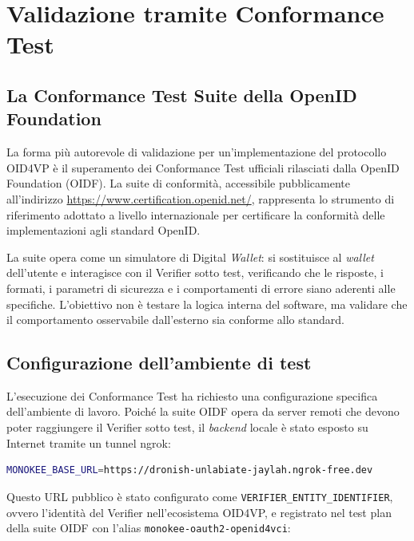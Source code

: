 \section{Validazione tramite Conformance Test}
\label{sec:validazione_conformance}

\subsection{La Conformance Test Suite della OpenID Foundation}
La forma più autorevole di validazione per un'implementazione del protocollo OID4VP è il superamento dei Conformance Test ufficiali rilasciati dalla OpenID Foundation (OIDF). La suite di conformità, accessibile pubblicamente all'indirizzo \url{https://www.certification.openid.net/}, rappresenta lo strumento di riferimento adottato a livello internazionale per certificare la conformità delle implementazioni agli standard OpenID.

La suite opera come un simulatore di Digital \textit{Wallet}: si sostituisce al \textit{wallet} dell'utente e interagisce con il Verifier sotto test, verificando che le risposte, i formati, i parametri di sicurezza e i comportamenti di errore siano aderenti alle specifiche. L'obiettivo non è testare la logica interna del software, ma validare che il comportamento osservabile dall'esterno sia conforme allo standard.

\subsection{Configurazione dell'ambiente di test}
L'esecuzione dei Conformance Test ha richiesto una configurazione specifica dell'ambiente di lavoro. Poiché la suite OIDF opera da server remoti che devono poter raggiungere il Verifier sotto test, il \textit{backend} locale è stato esposto su Internet tramite un tunnel ngrok:

\begin{lstlisting}[language=bash, numbers=none]
MONOKEE_BASE_URL=https://dronish-unlabiate-jaylah.ngrok-free.dev
\end{lstlisting}
Questo URL pubblico è stato configurato come \texttt{VERIFIER\_\allowbreak{}ENTITY\_\allowbreak{}IDENTIFIER}, ovvero l'identità del Verifier nell'ecosistema OID4VP, e registrato nel test plan della suite OIDF con l'alias \texttt{monokee-\allowbreak{}oauth2-\allowbreak{}openid4vci}:

